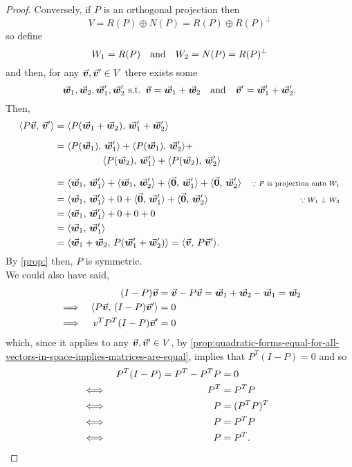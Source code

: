 \documentclass[../MathsNotesBase.tex]{subfiles}
\begin{document}
{\begin{proof}
		\nl
		Conversely, if $P$ is an orthogonal projection then
		\[ V = R(P) \oplus N(P) = R(P) \oplus R(P)^\perp \]
		so define 
		\[ W_1 = R(P) \hspace{10pt}\text{and}\hspace{10pt} W_2 = N(P) = R(P)^\perp \]
		and then, for any ${ \vec{\bm{v}},\vec{\bm{v}}' \in V }$ there exists some 
		\[ \vec{\bm{w}}_1,\vec{\bm{w}}_2,\vec{\bm{w}}_1',\vec{\bm{w}}_2' \text{ s.t. } \vec{\bm{v}} = \vec{\bm{w}}_1 + \vec{\bm{w}}_2 \hspace{10pt}\text{and}\hspace{10pt} \vec{\bm{v}}' = \vec{\bm{w}}_1' + \vec{\bm{w}}_2'. \]
		Then,
		\[\begin{aligned}
			\inner{P\v}{\v'} &= \inner{P(\w_1 + \w_2)}{\w_1' + \w_2'} \nn
			&= \inner{P(\w_1)}{\w_1'} + \inner{P(\w_1)}{\w_2'} +\\
			&\hspace{50pt} \inner{P(\w_2)}{\w_1'} + \inner{P(\w_2)}{\w_2'} &\sidecomment{} \nn
			&= \inner{\w_1}{\w_1'} + \inner{\w_1}{\w_2'} + \inner{\0}{\w_1'} + \inner{\0}{\w_2'} &\sidecomment{${ \because P }$ is projection onto $W_1$} \\
			&= \inner{\w_1}{\w_1'} + 0 + \inner{\0}{\w_1'} + \inner{\0}{\w_2'} &\sidecomment{${ \because W_1 \perp W_2 }$} \\
			&= \inner{\w_1}{\w_1'} + 0 + 0 + 0 &\sidecomment{} \\
			&= \inner{\w_1}{\w_1'} \\
			&= \inner{\w_1 + \w_2}{P(\w_1' + \w_2')} = \inner{\v}{P\v'}.
		\end{aligned}\]
		By \autoref{prop:} then, $P$ is symmetric.\\
		
		We could also have said,
		\[\begin{aligned}
			&&(I - P)\vec{\bm{v}} &= \vec{\bm{v}} - P\vec{\bm{v}} = \vec{\bm{w}}_1 + \vec{\bm{w}}_2 - \vec{\bm{w}}_1 = \vec{\bm{w}}_2 \\
			&\implies & \langle P\vec{\bm{v}},\, (I - P)\vec{\bm{v}}' \rangle &= 0 \\
			&\implies & v^T P^T (I - P) \vec{\bm{v}}' &= 0
		\end{aligned}\]
		which, since it applies to any ${ \vec{\bm{v}},\vec{\bm{v}}' \in V }$, by \autoref{prop:quadratic-forms-equal-for-all-vectors-in-space-implies-matrices-are-equal}, implies that ${ P^T (I - P) = 0 }$ and so
		\[\begin{aligned}
			&& P^T (I - P) = P^T - P^TP &= 0 \\
			&\iff & P^T &= P^T P &\text{\scriptsize{}} \\
			&\iff & P &= (P^T P)^T &\text{\scriptsize{}} \\
			&\iff & P &= P^T P &\text{\scriptsize{}} \\
			&\iff & P &= P^T.
		\end{aligned}\]
	\end{proof}


	\bigskip
	}
\end{document}
